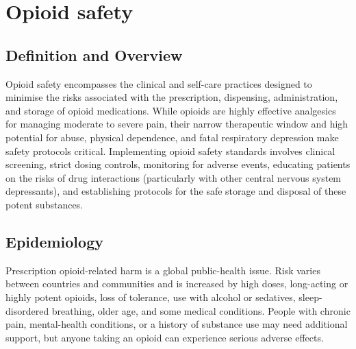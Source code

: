\chapter{Opioid safety}

\section*{Definition and Overview}
Opioid safety encompasses the clinical and self-care practices designed to minimise the risks associated with the prescription, dispensing, administration, and storage of opioid medications. While opioids are highly effective analgesics for managing moderate to severe pain, their narrow therapeutic window and high potential for abuse, physical dependence, and fatal respiratory depression make safety protocols critical. Implementing opioid safety standards involves clinical screening, strict dosing controls, monitoring for adverse events, educating patients on the risks of drug interactions (particularly with other central nervous system depressants), and establishing protocols for the safe storage and disposal of these potent substances.

\section*{Epidemiology}
Prescription opioid-related harm is a global public-health issue. Risk varies between countries and communities and is increased by high doses, long-acting or highly potent opioids, loss of tolerance, use with alcohol or sedatives, sleep-disordered breathing, older age, and some medical conditions. People with chronic pain, mental-health conditions, or a history of substance use may need additional support, but anyone taking an opioid can experience serious adverse effects.

